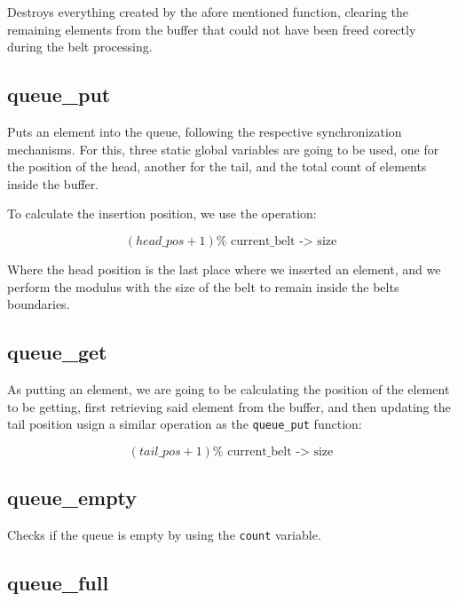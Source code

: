 \documentclass[es]{uc3mreport}
\begin{document}
\begin{report}
      Destroys everything created by the afore mentioned function,
      clearing the remaining elements from the buffer that could not
      have been freed corectly during the belt processing.

      \subsection{queue\_put}

      \setcounter{subsubsection}{0}

      Puts an element into the queue, following the respective
      synchronization mechanisms. For this, three static global
      variables are going to be used, one for the position of the head,
      another for the tail, and the total count of elements inside the
      buffer.

      To calculate the insertion position, we use the operation:

      \[(head\_pos + 1) \% \text{ current\_belt -> size}\]

      Where the head position is the last place where we inserted an
      element, and we perform the modulus with the size of the belt to
      remain inside the belts boundaries.

      \subsection{queue\_get}

      \setcounter{subsubsection}{0}

      As putting an element, we are going to be calculating the position
      of the element to be getting, first retrieving said element from
      the buffer, and then updating the tail position usign a similar
      operation as the \texttt{queue\_put} function:

      \[(tail\_pos + 1) \% \text{ current\_belt -> size}\]

      \subsection{queue\_empty}

      \setcounter{subsubsection}{0}

      Checks if the queue is empty by using the \texttt{count} variable.

      \subsection{queue\_full}


\end{report}
\end{document}
